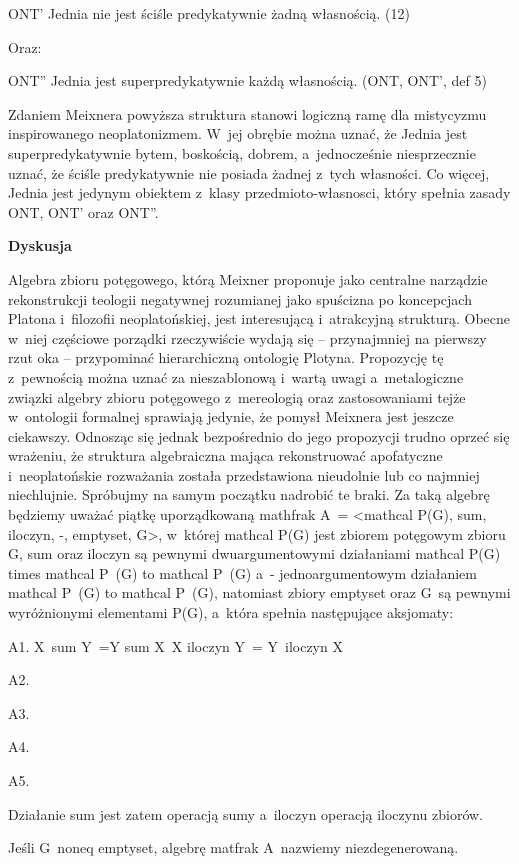 ONT' Jednia nie jest ściśle predykatywnie żadną własnością. (12)

Oraz:

ONT'' Jednia jest superpredykatywnie każdą własnością. (ONT, ONT', def 5)

Zdaniem Meixnera powyższa struktura stanowi logiczną ramę dla mistycyzmu inspirowanego neoplatonizmem. W~jej obrębie można uznać, że Jednia jest superpredykatywnie bytem, boskością, dobrem, a~jednocześnie niesprzecznie uznać, że ściśle predykatywnie nie posiada żadnej z~tych własności. Co więcej, Jednia jest jedynym obiektem z~klasy przedmioto-własnosci, który spełnia zasady ONT, ONT' oraz ONT''.

\textbf{Dyskusja}

Algebra zbioru potęgowego, którą Meixner proponuje jako centralne narządzie rekonstrukcji teologii negatywnej rozumianej jako spuścizna po koncepcjach Platona i~filozofii neoplatońskiej, jest interesującą i~atrakcyjną strukturą. Obecne w~niej częściowe porządki rzeczywiście wydają się -- przynajmniej na pierwszy rzut oka -- przypominać hierarchiczną ontologię Plotyna. Propozycję tę z~pewnością można uznać za nieszablonową i~wartą uwagi a~metalogiczne związki algebry zbioru potęgowego z~mereologią oraz zastosowaniami tejże w~ontologii formalnej sprawiają jedynie, że pomysł Meixnera jest jeszcze ciekawszy. Odnosząc się jednak bezpośrednio do jego propozycji trudno oprzeć się wrażeniu, że struktura algebraiczna mająca rekonstruować apofatyczne i~neoplatońskie rozważania została przedstawiona nieudolnie lub co najmniej niechlujnie. Spróbujmy na samym początku nadrobić te braki. Za taką algebrę będziemy uważać piątkę uporządkowaną mathfrak A~= {\textless}mathcal P(G), sum, iloczyn, -, emptyset, G{\textgreater}, w~której mathcal P(G) jest zbiorem potęgowym zbioru G, sum oraz iloczyn są pewnymi dwuargumentowymi działaniami mathcal P(G) times mathcal P~(G) to mathcal P~(G) a~- jednoargumentowym działaniem mathcal P~(G) to mathcal P~(G), natomiast zbiory emptyset oraz G~są pewnymi wyróżnionymi elementami P(G), a~która spełnia następujące aksjomaty:

A1. X~sum Y~=Y sum X~X iloczyn Y~= Y~iloczyn X

A2.

A3.

A4.

A5.

Działanie sum jest zatem operacją sumy a~iloczyn operacją iloczynu zbiorów.

Jeśli G~noneq emptyset, algebrę matfrak A~nazwiemy niezdegenerowaną.

